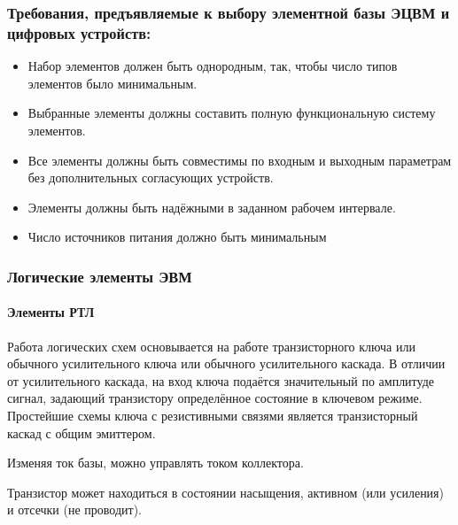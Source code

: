 \documentclass[10pt,a4paper,titlepage]{article}
\begin{document}
\subsubsection{Требования, предъявляемые к выбору элементной базы ЭЦВМ и цифровых устройств:}
\begin{itemize}
\item Набор элементов должен быть однородным, так, чтобы число типов элементов было минимальным.
\item Выбранные элементы должны составить полную функциональную систему элементов.
\item Все элементы должны быть совместимы по входным и выходным параметрам без дополнительных согласующих устройств.
\item Элементы должны быть надёжными в заданном рабочем интервале.
\item Число источников питания должно быть минимальным
\end{itemize}

\subsubsection{Логические элементы ЭВМ}

\paragraph{Элементы РТЛ}

Работа логических схем основывается на работе транзисторного ключа или обычного усилительного ключа или обычного усилительного каскада.
В отличии от усилительного каскада, на вход ключа подаётся значительный по амплитуде сигнал, задающий транзистору определённое состояние в ключевом режиме.
Простейшие схемы ключа с резистивными связями является транзисторный каскад с общим эмиттером.

Изменяя ток базы, можно управлять током коллектора.

Транзистор может находиться в состоянии насыщения, активном (или усиления) и отсечки (не проводит).
\end{document}
